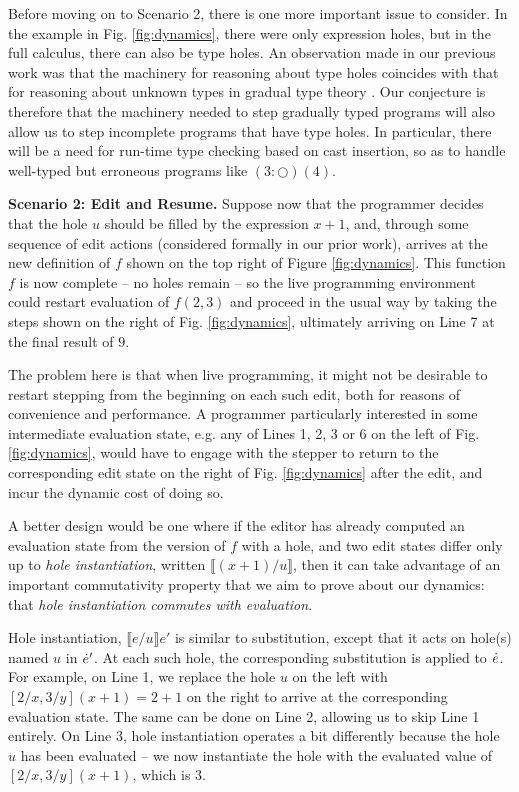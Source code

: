 Before moving on to Scenario 2, there is one more important issue to consider. In the example in Fig. \ref{fig:dynamics}, there were only expression holes, but in the full calculus, there can also be type holes. An observation made in our previous work was that the machinery for reasoning about type holes coincides with that for reasoning about unknown types in gradual type theory \cite{Siek06a}. Our conjecture is therefore that the machinery needed to step gradually typed programs will also allow us to step incomplete programs that have type holes. In particular, there will be a need for run-time type checking based on cast insertion, so as to handle well-typed but erroneous programs like $(3 : \Circle)(4)$. 

\vspace{1ex}
\noindent\textbf{Scenario 2: Edit and Resume.}
Suppose now that the programmer decides that the hole $u$ should
 be filled by the expression $x+1$, and, through some sequence of edit actions (considered formally in our prior work), arrives at 
the new definition of $f$ shown on the top right of Figure \ref{fig:dynamics}. This function $f$ is now complete -- no holes remain -- so the live programming environment 
could restart evaluation of $f(2, 3)$ and proceed in the usual way by taking the steps shown on
the right of Fig. \ref{fig:dynamics}, ultimately arriving on Line 7 at the final result of $9$.

The problem here is that when live programming, it might not be desirable to restart stepping from the beginning on each such edit, both for reasons of convenience and performance. A programmer particularly interested in some intermediate evaluation state, e.g. any of Lines 1, 2, 3 or 6 on the left of Fig. \ref{fig:dynamics}, would have to engage with the stepper to return to the corresponding edit state on the right of Fig. \ref{fig:dynamics} after the edit, and incur the dynamic cost of doing so.

A better design would be one where if the editor has already computed an evaluation 
state from the version of $f$ with a hole, and  
two edit states differ only up to \emph{hole instantiation}, written 
$\llbracket (x+1) / u
\rrbracket$, then it can take advantage of an important commutativity property that we aim 
to prove about our dynamics: that 
\emph{hole instantiation commutes with evaluation}. 

Hole instantiation, $\llbracket e / u \rrbracket e'$ is similar to substitution, except that it acts on
 hole(s) named $u$ in $\dot{e}'$. At each such hole, the corresponding substitution is applied to $\dot{e}$. For example, on Line 1, we replace the hole $u$ on the left with $[2/x,3/y](x+1) = 2 + 1$ on the right to arrive at the corresponding evaluation state. The same can be done on Line 2, allowing us to skip Line 1 entirely. On Line 3, hole instantiation operates a bit differently because the hole $u$ has been evaluated -- we now instantiate the hole with the evaluated value of $[2/x, 3/y](x + 1)$, which is $3$. 

